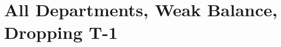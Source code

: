 \documentclass[12pt,a4paper]{article}
\begin{document}
\begin{center}

\end{center}

\pagebreak

\section{All Departments, Weak Balance, Dropping T-1}

\begin{center}

\end{center}

\begin{center}

\end{center}

\end{document}
